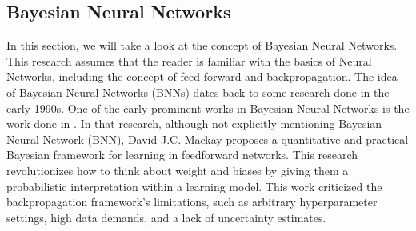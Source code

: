 \documentclass[ %
                    author={Revalda Putawara},
                supervisor={Dr. James Pope},
                    degree={MSc},
                     title={Robustness of Bayesian Neural Networks Design Choices Against Weight and Bias Perturbation Induced by Single Event Upsets (SEUs)},
                      type={},
                      year={2025}]{dissertation}
\begin{document}

\subsection{Bayesian Neural Networks}

In this section, we will take a look at the concept of Bayesian Neural Networks. This research assumes that the reader is familiar with the basics of Neural Networks, including the concept of feed-forward and backpropagation. The idea of Bayesian Neural Networks (BNNs) dates back to some research done in the early 1990s. One of the early prominent works in Bayesian Neural Networks is the work done in \cite{Mackay1992a}. In that research, although not explicitly mentioning Bayesian Neural Network (BNN), David J.C. Mackay proposes a quantitative and practical Bayesian framework for learning in feedforward networks. This research revolutionizes how to think about weight and biases by giving them a probabilistic interpretation within a learning model. This work criticized the backpropagation framework's limitations, such as arbitrary hyperparameter settings, high data demands, and a lack of uncertainty estimates.

\end{document}
